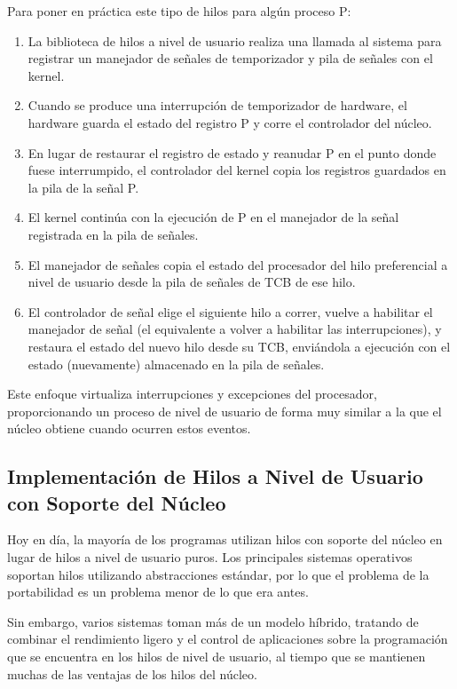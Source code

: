 \documentclass[10pt]{book}
\begin{document}
Para poner en práctica este tipo de hilos para algún proceso P:
\begin{enumerate}
\item La biblioteca de hilos a nivel de usuario realiza una llamada al sistema para registrar un manejador de señales de temporizador y pila de señales con el kernel.
\item Cuando se produce una interrupción de temporizador de hardware, el hardware guarda el estado del registro P y corre el controlador del núcleo.
\item En lugar de restaurar el registro de estado y reanudar P en el punto donde fuese interrumpido, el controlador del kernel copia los registros guardados en la pila de la señal P.
\item El kernel continúa con la ejecución de P en el manejador de la señal registrada en la pila de señales.
\item El manejador de señales copia el estado del procesador del hilo preferencial a nivel de usuario desde la pila de señales de TCB de ese hilo.
\item El controlador de señal elige el siguiente hilo a correr, vuelve a habilitar el manejador de señal (el equivalente a volver a habilitar las interrupciones), y restaura el estado del nuevo hilo desde su TCB, enviándola a ejecución con el estado (nuevamente) almacenado en la pila de señales.
\end{enumerate}

Este enfoque virtualiza interrupciones y excepciones del procesador, proporcionando un proceso de nivel de usuario de forma muy similar a la que el núcleo obtiene cuando ocurren estos eventos.

\subsection{Implementación de Hilos a Nivel de Usuario con Soporte del Núcleo}
Hoy en día, la mayoría de los programas utilizan hilos con soporte del núcleo en lugar de hilos a nivel de usuario puros. Los principales sistemas operativos soportan hilos utilizando abstracciones estándar, por lo que el problema de la portabilidad es un problema menor de lo que era antes.

Sin embargo, varios sistemas toman más de un modelo híbrido, tratando de combinar el rendimiento ligero y el control de aplicaciones sobre la programación que se encuentra en los hilos de nivel de usuario, al tiempo que se mantienen muchas de las ventajas de los hilos del núcleo.
\end{document}
